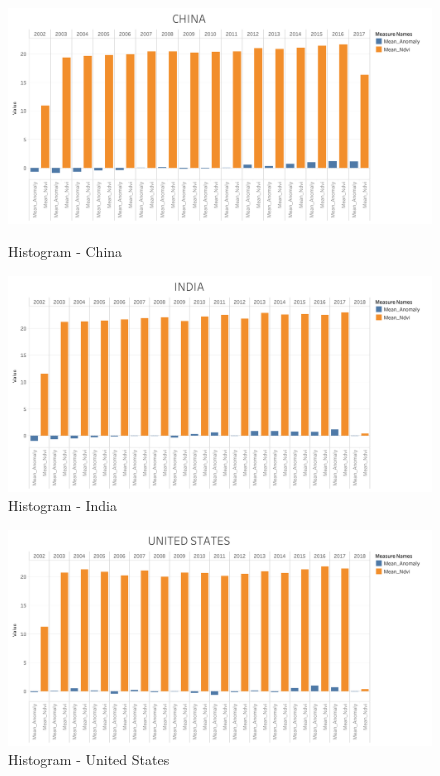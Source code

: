 \begin{itemize}
     \begin{figure}[!htb]
        \begin{minipage}{0.5\textwidth}
            \centering
            \includegraphics[width=1.0\linewidth]{figures/ch5/Histograms/CHINA_histogram.png}
            \caption{Histogram - China}\label{Fig:CHINA_histogram}
        \end{minipage}\hfill
        \begin{minipage}{0.5\textwidth}
            \centering
            \includegraphics[width=1.0\linewidth]{figures/ch5/Histograms/INDIA_histogram.png}
            \caption{Histogram - India}\label{Fig:INDIA_histogram}
        \end{minipage}
    \end{figure}
    
     \begin{figure}[H]
            \centering
            \includegraphics[width=0.5\linewidth]{figures/ch5/Histograms/US_histogram.png}
            \caption{\label{fig:US_histogram} Histogram - United States}
    \end{figure}
\newpage

\end{itemize}



